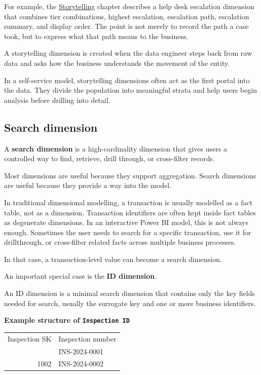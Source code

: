 \documentclass[10pt,openany,10pt]{book}
\newcounter{none}
\let\podeToprule\toprule
\let\podeMidrule\midrule
\let\podeBottomrule\bottomrule
\renewcommand{\toprule}{\arrayrulecolor{pbiGrid}\podeToprule}
\renewcommand{\midrule}{\arrayrulecolor{pbiGrid}\podeMidrule}
\renewcommand{\bottomrule}{\arrayrulecolor{pbiGrid}\podeBottomrule}
\begin{document}
For example, the
\hyperref[docs-creating-information-storytelling]{Storytelling} chapter
describes a help desk escalation dimension that combines tier
combinations, highest escalation, escalation path, escalation summary,
and display order. The point is not merely to record the path a case
took, but to express what that path means to the business.

A storytelling dimension is created when the data engineer steps back
from raw data and asks how the business understands the movement of the
entity.

In a self-service model, storytelling dimensions often act as the first
portal into the data. They divide the population into meaningful strata
and help users begin analysis before drilling into detail.

\subsection{Search dimension}\label{search-dimension}

A \textbf{search dimension} is a high-cardinality dimension that gives
users a controlled way to find, retrieve, drill through, or cross-filter
records.

Most dimensions are useful because they support aggregation. Search
dimensions are useful because they provide a way into the model.

In traditional dimensional modelling, a transaction is usually modelled
as a fact table, not as a dimension. Transaction identifiers are often
kept inside fact tables as degenerate dimensions. In an interactive
Power BI model, this is not always enough. Sometimes the user needs to
search for a specific transaction, use it for drillthrough, or
cross-filter related facts across multiple business processes.

In that case, a transaction-level value can become a search dimension.

An important special case is the \textbf{ID dimension}.

An ID dimension is a minimal search dimension that contains only the key
fields needed for search, usually the surrogate key and one or more
business identifiers.

\textbf{Example structure of
\texttt{\textquotesingle{}Inspection\ ID\textquotesingle{}}}

{\def\LTcaptype{none} %
\begin{longtable}[]{@{}rl@{}}
\toprule\noalign{}
Inspection SK & Inspection number \\
\midrule\noalign{}
\endhead
\bottomrule\noalign{}
\endlastfoot
1001 & INS-2024-0001 \\
1002 & INS-2024-0002 \\
\end{longtable}
}
\end{document}
